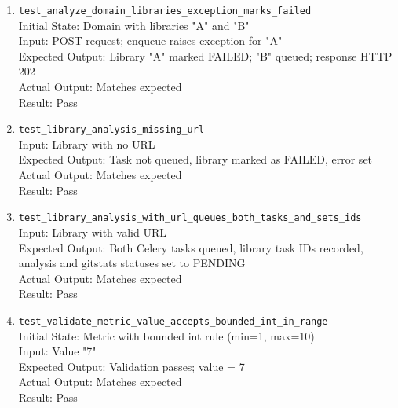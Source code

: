 \documentclass[12pt, titlepage]{article}
\begin{document}
\begin{enumerate}
      \\Input: POST request to analyze all domain libraries; enqueue patched to succeed for "A" and fail for "B"
      \\Expected Output: HTTP 202 Accepted; queued and failed lists populated appropriately
      \\Actual Output: Matches expected; queued includes "A", failed includes "B"
      \\Result: Pass
    \item \texttt{test\_analyze\_domain\_libraries\_exception\_marks\_failed} \label{test-analyze-domain-libraries-exception-marks-failed}
      \\Initial State: Domain with libraries "A" and "B"
      \\Input: POST request; enqueue raises exception for "A"
      \\Expected Output: Library "A" marked FAILED; "B" queued; response HTTP 202
      \\Actual Output: Matches expected
      \\Result: Pass
    \item \texttt{test\_library\_analysis\_missing\_url} \label{test-library-analysis-missing-url}
      \\Input: Library with no URL
      \\Expected Output: Task not queued, library marked as FAILED, error set
      \\Actual Output: Matches expected
      \\Result: Pass
    \item \texttt{test\_library\_analysis\_with\_url\_queues\_both\_tasks\_and\_sets\_ids} \label{test-library-analysis-with-url-queues-both-tasks-and-sets-ids}
      \\Input: Library with valid URL
      \\Expected Output: Both Celery tasks queued, library task IDs recorded, analysis and gitstats statuses set to PENDING
      \\Actual Output: Matches expected
      \\Result: Pass
    \item \texttt{test\_validate\_metric\_value\_accepts\_bounded\_int\_in\_range} \label{test-validate-metric-value-accepts-bounded-int-in-range}
      \\Initial State: Metric with bounded int rule (min=1, max=10)
      \\Input: Value "7"
      \\Expected Output: Validation passes; value = 7
      \\Actual Output: Matches expected
      \\Result: Pass


\end{enumerate}
\end{document}
